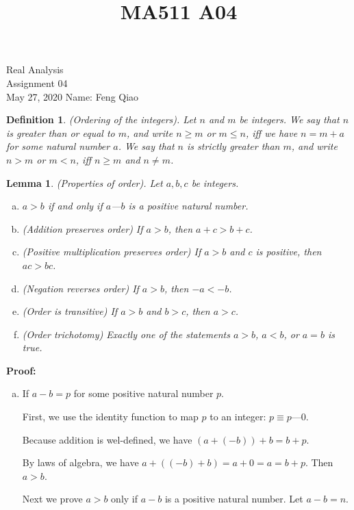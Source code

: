 \documentclass[12pt]{article}
\title{MA511 A04}
\newtheorem{lem}{Lemma}%
\newtheorem{defn}{Definition}
\begin{document}
\begin{flushleft}
{\sc \Large Real Analysis} \\
\medskip
Assignment 04\\
May 27, 2020
\hfill Name: Feng Qiao\\

\setdefaultleftmargin{0pt}{}{}{}{}{}

\begin{defn}
(Ordering of the integers). Let \(n\) and \(m\) be integers. We say that \(n\) is greater than or equal to \(m\), and write \(n \geq m\) or \(m \leq n\),  iff we have \(n = m + a\) for some natural number \(a\). We say that \(n\) is strictly greater than \(m\), and write \(n > m\) or \(m < n\), iff \(n \geq m\) and \(n \neq m\).
\end{defn}

\begin{lem}
(Properties of order). Let \(a, b, c\) be integers.
\begin{enumerate}[(a)]
  \item \(a > b\) if and only if \(a\)---\(b\) is a positive natural number.
    \item (Addition preserves order) If \(a > b\), then \(a + c > b + c\).
    \item (Positive multiplication preserves order) If \(a > b\) and \(c\) is positive, then \(ac > bc\).
    \item (Negation reverses order) If \(a > b\), then \(-a < -b\).
    \item (Order is transitive) If \(a > b\) and \(b > c\), then \(a > c\).
    \item (Order trichotomy) Exactly one of the statements \(a > b\), \(a < b\), or \(a = b\) is true.
\end{enumerate}
\end{lem}

\textbf{Proof:}

\begin{enumerate}[(a)]
  \item If \(a-b=p\) for some positive natural number \(p\).

    First, we use the identity function to map \(p\) to an integer: \(p \equiv p\)---0.

    Because addition is wel-defined, we have \((a + (-b)) + b =  b + p\).

    By laws of algebra, we have \(a + ((-b)+b)=a + 0 =a=b+p\). Then \(a>b\).

    Next we prove \(a>b\) only if \(a-b\) is a positive natural number. Let \(a -b =n\).


\end{enumerate}
\end{flushleft}
\end{document}
